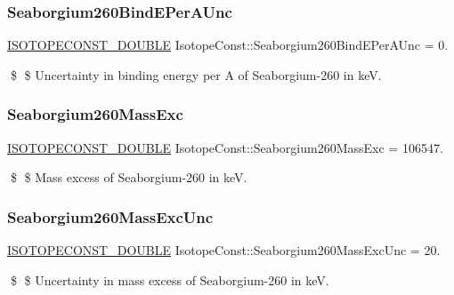 \subsubsection{\texorpdfstring{Seaborgium260\+Bind\+E\+Per\+A\+Unc}{Seaborgium260BindEPerAUnc}}
{\footnotesize\ttfamily \mbox{\hyperlink{group___isotope_const-_macros_ga8f45a7272ce02c0b4c65c44636ed719a}{I\+S\+O\+T\+O\+P\+E\+C\+O\+N\+S\+T\+\_\+\+D\+O\+U\+B\+LE}} Isotope\+Const\+::\+Seaborgium260\+Bind\+E\+Per\+A\+Unc = 0.}

\$ \$ Uncertainty in binding energy per A of Seaborgium-\/260 in keV. \mbox{\label{group___isotope_const-_seaborgium-_sg260_ga7441bbe8ce1c8d4ba603d3ed23759451}} 
\subsubsection{\texorpdfstring{Seaborgium260\+Mass\+Exc}{Seaborgium260MassExc}}
{\footnotesize\ttfamily \mbox{\hyperlink{group___isotope_const-_macros_ga8f45a7272ce02c0b4c65c44636ed719a}{I\+S\+O\+T\+O\+P\+E\+C\+O\+N\+S\+T\+\_\+\+D\+O\+U\+B\+LE}} Isotope\+Const\+::\+Seaborgium260\+Mass\+Exc = 106547.}

\$ \$ Mass excess of Seaborgium-\/260 in keV. \mbox{\label{group___isotope_const-_seaborgium-_sg260_ga6f001cad36566e93d8d1569b4c5a8726}} 
\subsubsection{\texorpdfstring{Seaborgium260\+Mass\+Exc\+Unc}{Seaborgium260MassExcUnc}}
{\footnotesize\ttfamily \mbox{\hyperlink{group___isotope_const-_macros_ga8f45a7272ce02c0b4c65c44636ed719a}{I\+S\+O\+T\+O\+P\+E\+C\+O\+N\+S\+T\+\_\+\+D\+O\+U\+B\+LE}} Isotope\+Const\+::\+Seaborgium260\+Mass\+Exc\+Unc = 20.}

\$ \$ Uncertainty in mass excess of Seaborgium-\/260 in keV. \mbox{\label{group___isotope_const-_seaborgium-_sg260_ga9dac3a58c46f628560d39f783661f3d7}} 

